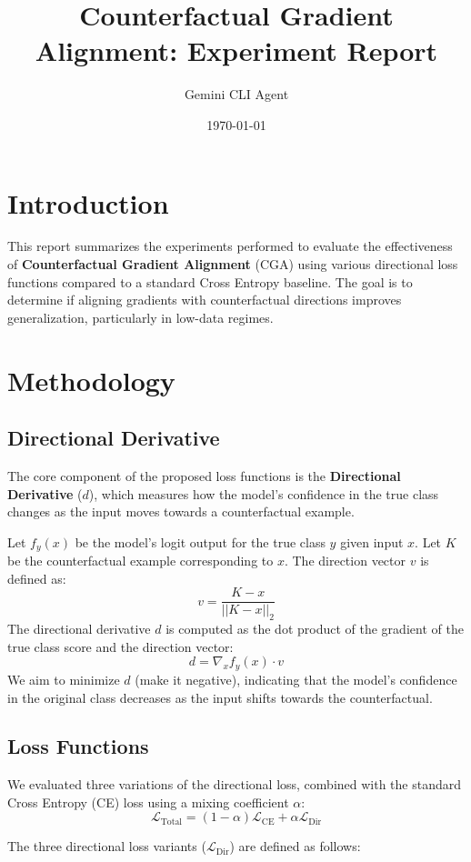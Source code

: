 \documentclass{article}
\title{Counterfactual Gradient Alignment: Experiment Report}
\author{Gemini CLI Agent}
\date{\today}
\begin{document}
\maketitle

\section{Introduction}
This report summarizes the experiments performed to evaluate the effectiveness of \textbf{Counterfactual Gradient Alignment} (CGA) using various directional loss functions compared to a standard Cross Entropy baseline. The goal is to determine if aligning gradients with counterfactual directions improves generalization, particularly in low-data regimes.

\section{Methodology}

\subsection{Directional Derivative}
The core component of the proposed loss functions is the \textbf{Directional Derivative} ($d$), which measures how the model's confidence in the true class changes as the input moves towards a counterfactual example.

Let $f_{y}(x)$ be the model's logit output for the true class $y$ given input $x$. Let $K$ be the counterfactual example corresponding to $x$. The direction vector $v$ is defined as:
\[
v = \frac{K - x}{||K - x||_2}
\]
The directional derivative $d$ is computed as the dot product of the gradient of the true class score and the direction vector:
\[
d = \nabla_x f_{y}(x) \cdot v
\]
We aim to minimize $d$ (make it negative), indicating that the model's confidence in the original class decreases as the input shifts towards the counterfactual.

\subsection{Loss Functions}
We evaluated three variations of the directional loss, combined with the standard Cross Entropy (CE) loss using a mixing coefficient $\alpha$:
\[
\mathcal{L}_{\text{Total}} = (1 - \alpha) \mathcal{L}_{\text{CE}} + \alpha \mathcal{L}_{\text{Dir}}
\]

The three directional loss variants ($\mathcal{L}_{\text{Dir}}$) are defined as follows:
\end{document}
